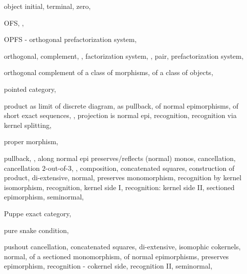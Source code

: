\documentclass [12pt,oneside]{book}%
\theoremstyle{captionstyle}  %
\begin{document}
\begin{theindex}
    \indexspace

    \item object
    \subitem initial, 
    \subitem terminal, 
    \subitem zero, 
    \item OFS, , 
    \item OPFS - orthogonal prefactorization system, 
    \item orthogonal, 
    \subitem complement, , 
    \subitem factorization system, , 
    \subitem pair, 
    \subitem prefactorization system, 
    \item orthogonal complement
    \subitem of a class of morphisms, 
    \subitem of a class of objects, 

    \indexspace

    \item pointed
    \subitem category, 
    \item product
    \subitem as limit of discrete diagram, 
    \subitem as pullback, 
    \subitem of normal epimorphisms, 
    \subitem of short exact sequences, , 
    \subitem projection is normal epi, 
    \subitem recognition, 
    \subitem recognition via kernel splitting, 
    \item proper
    \subitem morphism, 
    \item pullback, , 
    \subitem along normal epi preserves/reflects (normal) monos,
    \subitem cancellation, 
    \subitem cancellation $2$-out-of-$3$, ,
    \subitem composition, 
    \subitem concatenated squares, 
    \subitem construction of product, 
    \subitem di-extensive, 
    \subitem normal, 
    \subitem preserves monomorphism, 
    \subitem recognition by kernel isomorphism, 
    \subitem recognition, kernel side I, 
    \subitem recognition: kernel side II, 
    \subitem sectioned epimorphism, 
    \subitem seminormal, 
    \item Puppe
    \subitem exact category, 
    \item pure snake
    \subitem condition, 
    \item pushout
    \subitem cancellation, 
    \subitem concatenated squares, 
    \subitem di-extensive, 
    \subitem isomophic cokernels, 
    \subitem normal, 
    \subitem of a sectioned monomorphism, 
    \subitem of normal epimorphisms, 
    \subitem preserves epimorphism, 
    \subitem recognition - cokernel side, 
    \subitem recognition II, 
    \subitem seminormal, 


\end{theindex}
\end{document}
